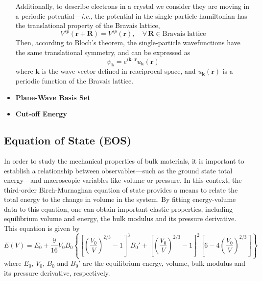 \begin{itemize}
Additionally, to describe electrons in a crystal we consider they 
are moving in a periodic potential---\emph{i.e.}, the potential in 
the single-particle hamiltonian has the translational property 
of the Bravais lattice, 
\begin{equation}
    \label{eq85}
    V^{sp}(\mathbf{r} + \mathbf{R}) = V^{sp}(\mathbf{r}), \quad \forall \, \mathbf{R} \in \text{Bravais lattice}
\end{equation}
Then, according to Bloch's theorem, the single-particle wavefunctions 
have the same translational symmetry, and can be expressed as
\begin{equation}
    \label{eq86}
    \psi_{\mathbf{k}} = e^{i\mathbf{k} \cdot \mathbf{r}} u_{\mathbf{k}}(\mathbf{r})
\end{equation}
where $\mathbf{k}$ is the wave vector defined in reaciprocal space, and 
$u_{\mathbf{k}}(\mathbf{r})$ is a periodic function of the Bravais lattice. 


    \item \textbf{Plane-Wave Basis Set}
    

    \item \textbf{Cut-off Energy}
\end{itemize}
\subsection{Equation of State (EOS)}
In order to study the mechanical properties of bulk materials, it is 
important to establish a relationship between observables---such as the 
ground state total energy---and macroscopic variables like volume or pressure. In this context, the 
third-order Birch-Murnaghan equation of state\supercite{Birch1947,poirier2000introduction} provides
a means to relate the total energy to the change in volume in the system. By fitting energy-volume data to this 
equation, one can obtain important elastic properties, including equilibrium volume and energy,
the bulk modulus and its pressure derivative. This equation is given by 
\begin{equation}
    \label{eq83}
     E(V) = E_0 + \frac{9}{16} V_0 B_0 \left\{ \left[ \left( \frac{V_0}{V} \right)^{2/3} 
     - 1 \right]^3 B_0' + \left[ \left( \frac{V_0}{V} \right)^{2/3} - 1 \right]^2 \left[6 - 4 \left( \frac{V_0}{V} \right)^{2/3} \right] \right\}
\end{equation}
where $E_0$, $V_0$, $B_0$ and $B_0'$ are the equilibrium energy, volume, bulk modulus and its pressure derivative, respectively.

